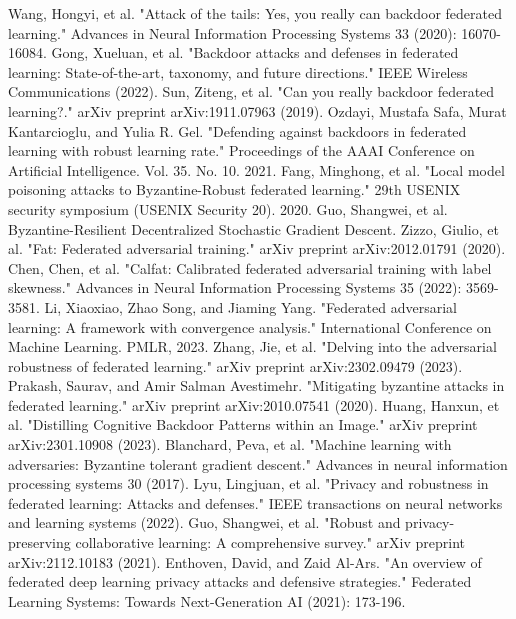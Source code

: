 \documentclass[conference]{IEEEtran}
\begin{document}
\begin{thebibliography}{00}
     Wang, Hongyi, et al. "Attack of the tails: Yes, you really can backdoor federated learning." Advances in Neural Information Processing Systems 33 (2020): 16070-16084.   
     Gong, Xueluan, et al. "Backdoor attacks and defenses in federated learning: State-of-the-art, taxonomy, and future directions." IEEE Wireless Communications (2022).  
     Sun, Ziteng, et al. "Can you really backdoor federated learning?." arXiv preprint arXiv:1911.07963 (2019).  
     Ozdayi, Mustafa Safa, Murat Kantarcioglu, and Yulia R. Gel. "Defending against backdoors in federated learning with robust learning rate." Proceedings of the AAAI Conference on Artificial Intelligence. Vol. 35. No. 10. 2021.  
     Fang, Minghong, et al. "Local model poisoning attacks to {Byzantine-Robust} federated learning." 29th USENIX security symposium (USENIX Security 20). 2020.  
     Guo, Shangwei, et al. Byzantine-Resilient Decentralized Stochastic Gradient Descent.  
     Zizzo, Giulio, et al. "Fat: Federated adversarial training." arXiv preprint arXiv:2012.01791 (2020).  
     Chen, Chen, et al. "Calfat: Calibrated federated adversarial training with label skewness." Advances in Neural Information Processing Systems 35 (2022): 3569-3581.  
     Li, Xiaoxiao, Zhao Song, and Jiaming Yang. "Federated adversarial learning: A framework with convergence analysis." International Conference on Machine Learning. PMLR, 2023.  
     Zhang, Jie, et al. "Delving into the adversarial robustness of federated learning." arXiv preprint arXiv:2302.09479 (2023).  
     Prakash, Saurav, and Amir Salman Avestimehr. "Mitigating byzantine attacks in federated learning." arXiv preprint arXiv:2010.07541 (2020).   
     Huang, Hanxun, et al. "Distilling Cognitive Backdoor Patterns within an Image." arXiv preprint arXiv:2301.10908 (2023).   
     Blanchard, Peva, et al. "Machine learning with adversaries: Byzantine tolerant gradient descent." Advances in neural information processing systems 30 (2017).   
     Lyu, Lingjuan, et al. "Privacy and robustness in federated learning: Attacks and defenses." IEEE transactions on neural networks and learning systems (2022).    
     Guo, Shangwei, et al. "Robust and privacy-preserving collaborative learning: A comprehensive survey." arXiv preprint arXiv:2112.10183 (2021).    
     Enthoven, David, and Zaid Al-Ars. "An overview of federated deep learning privacy attacks and defensive strategies." Federated Learning Systems: Towards Next-Generation AI (2021): 173-196.  

\end{thebibliography}
\end{document}
